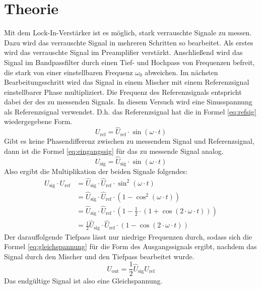 
\section{Theorie}
Mit dem Lock-In-Verstärker ist es möglich, stark verrauschte Signale zu
messen.  Dazu wird das verrauschte Signal in mehreren Schritten so
bearbeitet. Als erstes wird das verrauschte Signal im Preamplifier
verstärkt. Anschließend wird das Signal im Bandpassfilter durch einen
Tief- und Hochpass von Frequenzen befreit, die stark von einer
einstellbaren Frequenz $\omega_0$ abweichen.  Im nächsten
Bearbeitungsschritt wird das Signal in einem Mischer mit einem
Referenzsignal einstellbarer Phase multipliziert. Die Frequenz des
Referenzsignals entspricht dabei der des zu messenden Signals.  In
diesem Versuch wird eine Sinusspannung als Referenzsignal
verwendet. D.h. das Referenzsignal hat die in Formel \eqref{eq:refsig}
wiedergegebene Form.
%
\begin{equation}
  \label{eq:refsig}
  U_\text{ref} = \widehat{U}_\text{ref} \cdot \sin(\omega \cdot t)
\end{equation}
%
Gibt es keine Phasendifferenz zwischen zu messendem Signal und
Referenzsignal, dann ist die Formel \eqref{eq:eingangssig} für das zu
messende Signal analog.
%
\begin{equation}
  \label{eq:eingangssig}
  U_\text{sig} = \widehat{U}_\text{sig} \cdot \sin(\omega \cdot t)
\end{equation}
%
Also ergibt die Multiplikation der beiden Signale folgendes:
%
\begin{equation*}
  \begin{split}
    U_\text{sig} \cdot U_\text{ref}
    &= \widehat{U}_\text{sig}\cdot \widehat{U}_\text{ref}\cdot
    \sin^2(\omega \cdot t) \\
    &= \widehat{U}_\text{sig} \cdot \widehat{U}_\text{ref}
    \cdot (1 - \cos^2(\omega \cdot t)) \\
    &= \widehat{U}_\text{sig} \cdot \widehat{U}_\text{ref} \cdot (1 -
    \frac{1}{2} \cdot (1 +
    \cos(2\cdot \omega \cdot t)))\\
    &= \frac{1}{2} \widehat{U}_\text{sig} \cdot \widehat{U}_\text{ref}
    \cdot(1 - \cos(2\cdot \omega\cdot t))
  \end{split}
\end{equation*}
%
Der darauffolgende Tiefpass lässt nur niedrige Frequenzen durch, sodass
sich die Formel \eqref{eq:gleichspannung} für die Form des
Ausgangssignals ergibt, nachdem das Signal durch den Mischer und den
Tiefpass bearbeitet wurde.
%
\begin{equation}
  \label{eq:gleichspannung}
  U_\text{out} = \frac{1}{2} \widehat{U}_\text{sig} \widehat{U}_\text{ref}
\end{equation}
%
Das endgültige Signal ist also eine Gleichspannung.

